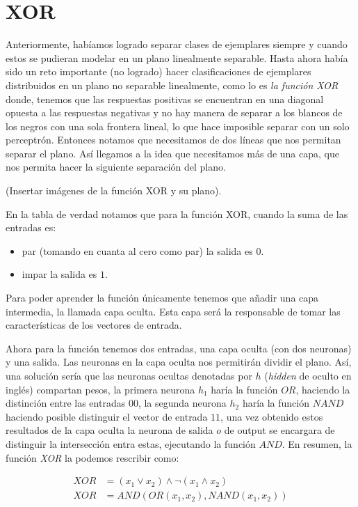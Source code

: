 \section{XOR}


Anteriormente, habíamos logrado separar clases de ejemplares siempre y cuando estos se pudieran modelar en un plano linealmente separable. Hasta ahora había sido un reto importante (no logrado) hacer clasificaciones de ejemplares distribuidos en un plano no separable linealmente, como lo es \emph{la función XOR} donde, tenemos que las respuestas positivas se encuentran en una diagonal opuesta a las respuestas negativas y no hay manera de separar a los blancos de los negros con una sola frontera lineal, lo que hace imposible separar con un solo perceptrón. Entonces notamos que necesitamos de dos líneas que nos permitan separar el plano. Así llegamos a la idea que necesitamos más de una capa, que nos permita hacer la siguiente separación del plano.


(Insertar imágenes de la función XOR y su plano).


En la tabla de verdad notamos que para la función XOR, cuando la suma de las entradas es:
\begin{itemize}
 \item par (tomando en cuanta al cero como par) la salida es $0$.
 \item impar la salida es $1$.
\end{itemize}


Para poder aprender la función únicamente tenemos que añadir una capa intermedia, la llamada capa oculta. Esta capa será la responsable de tomar las características de los vectores de entrada.


Ahora para la función tenemos dos entradas, una capa oculta (con dos neuronas) y una salida. Las neuronas en la capa oculta nos permitirán dividir el plano. Así, una solución sería que las neuronas ocultas denotadas por $h$ (\emph{hidden} de oculto en inglés) compartan pesos, la primera neurona $h_1$ haría la función $OR$, haciendo la distinción entre las entradas $0 0$, la segunda neurona $h_2$ haría la función $NAND$ haciendo posible distinguir el vector de entrada $1 1$, una vez obtenido estos resultados de la capa oculta la neurona de salida $o$ de output se encargara de distinguir la intersección entra estas, ejecutando la función $AND$. En resumen, la función \emph{XOR} la podemos rescribir como:


\begin{equation}
 \begin{split}
    XOR &= (x_{1} \vee x_{2}) \wedge \neg(x_{1} \wedge x_{2}) \\
    XOR &= AND (OR(x_{1}, x_{2}), NAND(x_{1}, x_{2}))
 \end{split}
\end{equation}






